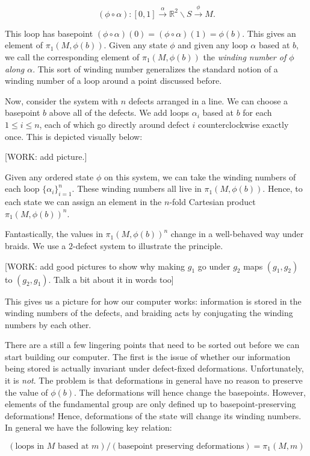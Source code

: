 \documentclass{article}
\theoremstyle{definition}
\newcommand{\RR}{\mathbb{R}}
\newcommand{\0}{\left|0\right>}
\newcommand{\1}{\left|1\right>}
\numberwithin{figure}{section}
\begin{document}
$$(\phi \circ \alpha): [0,1]\xrightarrow{\alpha} \RR^2 \backslash S \xrightarrow{\phi} M.$$

This loop has basepoint $(\phi \circ \alpha)(0)=(\phi\circ \alpha)(1)=\phi(b)$. This gives an element of $\pi_1(M,\phi(b))$. Given any state $\phi$ and given any loop $\alpha$ based at $b$, we call the corresponding element of $\pi_1(M,\phi(b))$ the \textit{winding number of $\phi$ along $\alpha$}. This sort of winding number generalizes the standard notion of a winding number of a loop around a point discussed before.

Now, consider the system with $n$ defects arranged in a line. We can choose a basepoint $b$ above all of the defects. We add loops $\alpha_i$ based at $b$ for each $1\leq i \leq n$, each of which go directly around defect $i$ counterclockwise exactly once. This is depicted visually below:

[WORK: add picture.]

Given any ordered state $\phi$ on this system, we can take the winding numbers of each loop $\{\alpha_i\}_{i=1}^n$. These winding numbers all live in $\pi_1(M,\phi(b))$. Hence, to each state we can assign an element in the $n$-fold Cartesian product $\pi_1(M,\phi(b))^n$.

Fantastically, the values in $\pi_1(M,\phi(b))^n$ change in a well-behaved way under braids. We use a $2$-defect system to illustrate the principle.

[WORK: add good pictures to show why making $g_1$ go under $g_2$ maps $(g_1,g_2)$ to $(g_2,g_1)$. Talk a bit about it in words too]

This gives us a picture for how our computer works: information is stored in the winding numbers of the defects, and braiding acts by conjugating the winding numbers by each other.

There are a still a few lingering points that need to be sorted out before we can start building our computer. The first is the issue of whether our information being stored is actually invariant under defect-fixed deformations. Unfortunately, it is \textit{not}. The problem is that deformations in general have no reason to preserve the value of $\phi(b)$. The deformations will hence change the basepoints. However, elements of the fundamental group are only defined up to basepoint-preserving deformations! Hence, deformations of the state will change its winding numbers. In general we have the following key relation:

$$\left(\text{loops in $M$ based at $m$}\right)/\left(\text{basepoint preserving deformations}\right)= \pi_1(M,m)$$
\end{document}

